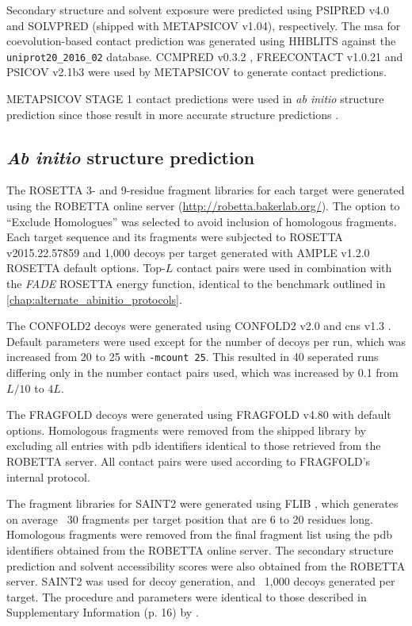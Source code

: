 Secondary structure and solvent exposure were predicted using PSIPRED v4.0 \cite{Jones1999-ed} and SOLVPRED (shipped with METAPSICOV v1.04), respectively. The \gls{msa} for coevolution-based contact prediction was generated using HHBLITS \cite{Remmert2011-kt} against the \texttt{uniprot20\_2016\_02} database. CCMPRED v0.3.2 \cite{Seemayer2014-zp}, FREECONTACT v1.0.21 \cite{Kajan2014-bx} and PSICOV v2.1b3 \cite{Jones2012-ks} were used by METAPSICOV to generate contact predictions.

METAPSICOV STAGE 1 contact predictions were used in \textit{ab initio} structure prediction since those result in more accurate structure predictions \cite{Jones2015-vq}.

\subsection{\textit{Ab initio} structure prediction} \label{sec:ample_saint2_modelling}
The ROSETTA 3- and 9-residue fragment libraries for each target were generated using the ROBETTA online server (\url{http://robetta.bakerlab.org/}). The option to ``Exclude Homologues'' was selected to avoid inclusion of homologous fragments. Each target sequence and its fragments were subjected to ROSETTA v2015.22.57859 \cite{Rohl2004-dj} and 1,000 decoys per target generated with AMPLE v1.2.0 ROSETTA default options. Top-$L$ contact pairs were used in combination with the \textit{FADE} ROSETTA energy function, identical to the benchmark outlined in \cref{chap:alternate_abinitio_protocols}.

The CONFOLD2 decoys were generated using CONFOLD2 v2.0 \cite{Adhikari2018-lj} and \gls{cns} v1.3 \cite{Brunger1998-sz}. Default parameters were used except for the number of decoys per run, which was increased from 20 to 25 with \texttt{-mcount 25}. This resulted in 40 seperated runs differing only in the number contact pairs used, which was increased by 0.1 from $L/10$ to $4L$.

The FRAGFOLD decoys were generated using FRAGFOLD v4.80 \cite{Jones2001-mc} with default options. Homologous fragments were removed from the shipped library  by excluding all entries with \gls{pdb} identifiers identical to those retrieved from the ROBETTA server. All contact pairs were used according to FRAGFOLD's internal protocol.

The fragment libraries for SAINT2 were generated using FLIB \cite{De_Oliveira2015-kb}, which generates on average ~30 fragments per target position that are 6 to 20 residues long. Homologous fragments were removed from the final fragment list using the \gls{pdb} identifiers obtained from the ROBETTA online server. The secondary structure prediction and solvent accessibility scores were also obtained from the ROBETTA server. SAINT2 was used for decoy generation, and ~1,000 decoys generated per target. The procedure and parameters were identical to those described in Supplementary Information (p. 16) by \textcite{De_Oliveira2017-sg}.

